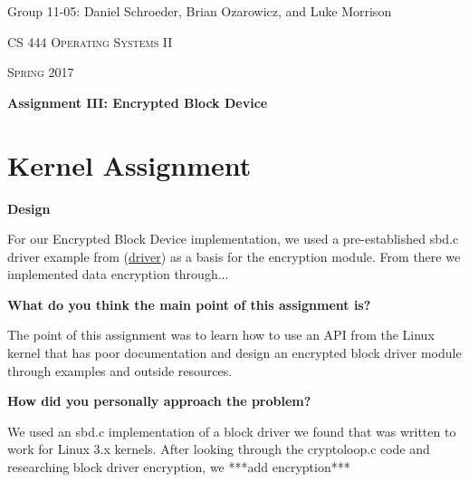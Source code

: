 \documentclass[10pt,letterpaper,draftclsnofoot,onecolumn]{IEEEtran}
\begin{document}
\begin{titlepage}
\centering
{\Large Group 11-05: Daniel Schroeder, Brian Ozarowicz, and Luke Morrison\par}
\vspace{1cm}
{\scshape\Large CS 444 Operating Systems II\par}
{\scshape\Large Spring 2017\par}
\vspace{1cm}
{\huge\bfseries Assignment III: Encrypted Block Device\par}
\vspace{2cm}
\begin{abstract}
This document is a summary of Assignment 3 for CS 444 Operating Systems II at Oregon State University Spring 2017. This document includes the design and implementation of the kernel assignment to implement an Encrypted Block Device, responses to the design and implimenation questions for the kernel and concurrency assignments, and a work log.
\end{abstract}
\end{titlepage}

\section{Kernel Assignment}
\bigskip

\noindent\textbf{Design}
\medskip

\medskip

\noindent For our Encrypted Block Device implementation, we used a pre-established sbd.c driver example from (\href{http://blog.superpat.com/2010/05/04/a-simple-block-driver-for-linux-kernel-2-6-31/}{driver}) as a basis for the encryption module. From there we implemented data encryption through...

\bigskip

\noindent\textbf{What do you think the main point of this assignment is?}
\medskip

\medskip

\noindent The point of this assignment was to learn how to use an API from the Linux kernel that has poor documentation and design an encrypted block driver module through examples and outside resources.
\bigskip

\noindent\textbf{How did you personally approach the problem?}
\medskip

\medskip

\noindent We used an sbd.c implementation of a block driver we found that was written to work for Linux 3.x kernels. After looking through the cryptoloop.c code and researching block driver encryption, we ***add encryption***
\medskip
\end{document}
